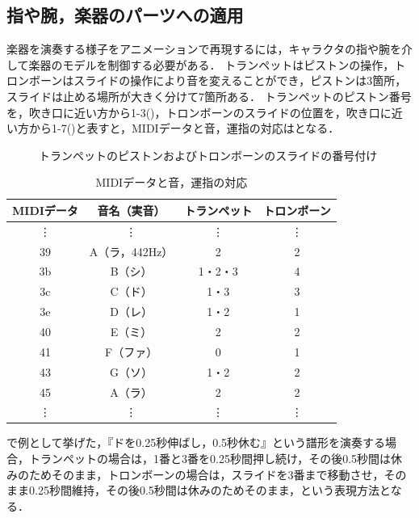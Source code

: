 \subsection{指や腕，楽器のパーツへの適用}
楽器を演奏する様子をアニメーションで再現するには，キャラクタの指や腕を介して楽器のモデルを制御する必要がある．
トランペットはピストンの操作，トロンボーンはスライドの操作により音を変えることができ，ピストンは3箇所，スライドは止める場所が大きく分けて7箇所ある．
トランペットのピストン番号を，吹き口に近い方から1-3()，トロンボーンのスライドの位置を，吹き口に近い方から1-7()と表すと，MIDIデータと音，運指の対応はとなる．
\begin{figure}[h]
	\centering
	\caption{トランペットのピストンおよびトロンボーンのスライドの番号付け}
	\label{fig:numbering}
\end{figure}

\begin{table}[h]
	\centering
	\caption{MIDIデータと音，運指の対応}
	\begin{tabular}{|c|c|c|c|} \hline
		MIDIデータ & 音名（実音） & トランペット & トロンボーン \\ \hline \hline
		\vdots & \vdots & \vdots & \vdots \\ \hline
		39 & A（ラ，442Hz） & 2 & 2 \\ \hline
		3b & B（シ） & 1・2・3 & 4 \\ \hline
		3c & C（ド） & 1・3 & 3 \\ \hline
		3e & D（レ） & 1・2 & 1 \\ \hline
		40 & E（ミ） & 2 & 2 \\ \hline
		41 & F（ファ） & 0 & 1 \\ \hline
		43 & G（ソ） & 1・2 & 2 \\ \hline
		45 & A（ラ） & 2 & 2 \\ \hline
		\vdots & \vdots & \vdots & \vdots \\ \hline
	\end{tabular}
	\label{tab:map}
\end{table}
\newpage
{}で例として挙げた，『ドを0.25秒伸ばし，0.5秒休む』という譜形を演奏する場合，トランペットの場合は，1番と3番を0.25秒間押し続け，その後0.5秒間は休みのためそのまま，トロンボーンの場合は，スライドを3番まで移動させ，そのまま0.25秒間維持，その後0.5秒間は休みのためそのまま，という表現方法となる．\\

